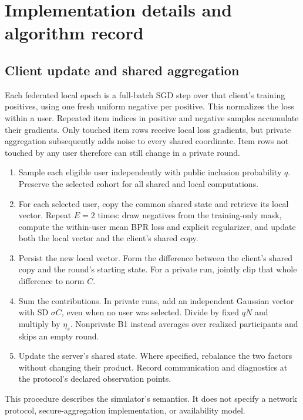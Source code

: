 \section{Implementation details and algorithm record}
\label{app:algorithms}
\subsection{Client update and shared aggregation}
Each federated local epoch is a full-batch SGD step over that client's
training positives, using one fresh uniform negative per positive. This
normalizes the loss within a user. Repeated item indices in positive and
negative samples accumulate their gradients. Only touched item rows receive
local loss gradients, but private aggregation subsequently adds noise to
every shared coordinate. Item rows not touched by any user therefore can
still change in a private round.

\begin{enumerate}[label=\arabic*.]
\item Sample each eligible user independently with public inclusion probability
$q$. Preserve the selected cohort for all shared and local computations.
\item For each selected user, copy the common shared state and retrieve its
local vector. Repeat $E=2$ times: draw negatives from the training-only mask,
compute the within-user mean BPR loss and explicit regularizer, and update
both the local vector and the client's shared copy.
\item Persist the new local vector. Form the difference between the client's
shared copy and the round's starting state. For a private run, jointly clip
that whole difference to norm $C$.
\item Sum the contributions. In private runs, add an independent Gaussian
vector with SD $\sigma C$, even when no user was selected. Divide by fixed
$qN$ and multiply by $\eta_s$. Nonprivate B1 instead averages over realized
participants and skips an empty round.
\item Update the server's shared state. Where specified, rebalance the two
factors without changing their product. Record communication and diagnostics
at the protocol's declared observation points.
\end{enumerate}
This procedure describes the simulator's semantics. It does not specify
a network protocol, secure-aggregation implementation, or availability model.


